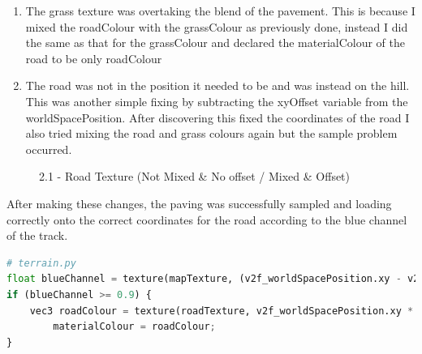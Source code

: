 \documentclass[a4 paper, 12pt]{article}
\begin{document}
\begin{enumerate}
    \item The grass texture was overtaking the blend of the pavement. This is because I mixed the roadColour with the grassColour as previously done, instead I did the same as that for the grassColour and declared the materialColour of the road to be only roadColour
    \item The road was not in the position it needed to be and was instead on the hill. This was another simple fixing by subtracting the xyOffset variable from the worldSpacePosition. After discovering this fixed the coordinates of the road I also tried mixing the road and grass colours again but the sample problem occurred.
\end{enumerate}

\begin{figure} [H]
        \caption{2.1 - Road Texture (Not Mixed \& No offset / Mixed \& Offset)}   
\end{figure}


After making these changes, the paving was successfully sampled and loading correctly onto the correct coordinates for the road according to the blue channel of the track.

\begin{lstlisting}[language=python]
# terrain.py       
float blueChannel = texture(mapTexture, (v2f_worldSpacePosition.xy - v2f_xyOffset) * v2f_xyNormScale).z;
if (blueChannel >= 0.9) {
    vec3 roadColour = texture(roadTexture, v2f_worldSpacePosition.xy * terrainTextureXyScale).xyz;
        materialColour = roadColour;
}
\end{lstlisting} 
\end{document}

